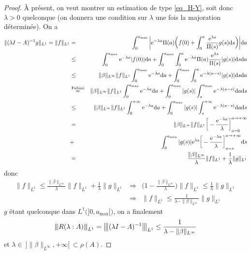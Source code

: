 \begin{proof}
    \`A présent, on veut montrer un estimation de type \eqref{eq_H-Y}, soit donc $\lambda >0$ quelconque (on donnera une condition sur $\lambda$ une fois la majoration déterminée). On a
    \begin{eqnarray*}
        \|(\lambda I-A)^{-1}g\|_{L^1} = \|f\|_{L^1} &=& \int_0^{a_{\max}} \bigg|\mathrm{e}^{-\lambda a}\Pi(a)\bigg(f(0)+\int_0^a \frac{\mathrm{e}^{\lambda s}}{\Pi(s)}g(s)\mathrm{d} s \bigg)\bigg| \mathrm{d} a \\
        &\leq& \int_0^{a_{\max}} \mathrm{e}^{-\lambda a} |f(0)| \mathrm{d} a +\int_0^{a_{\max}}\int_0^a \mathrm{e}^{-\lambda a}\Pi(a)\frac{\mathrm{e}^{\lambda s}}{\Pi(s)}|g(s)|\mathrm{d} s \mathrm{d} a \\
        &\leq& \|\beta\|_{L^{\infty}}\|f\|_{L^1} \int_0^{a_{\max}} \mathrm{e}^{-\lambda a}\mathrm{d} a + \int_0^{a_{\max}}\int_0^a \mathrm{e}^{-\lambda(a-s)}|g(s)|\mathrm{d} s \mathrm{d} a \\
        &\overset{\text{Fubini}}{=}& \|\beta\|_{L^{\infty}}\|f\|_{L^1} \int_0^{a_{\max}} \mathrm{e}^{-\lambda a}\mathrm{d} a + \int_0^{a_{\max}}|g(s)|\int_{s}^{a_{\max}} \mathrm{e}^{-\lambda (a-s)} \mathrm{d} a \mathrm{d} s \\
        &\leq& \|\beta\|_{L^{\infty}}\|f\|_{L^1} \int_0^{+\infty} \mathrm{e}^{-\lambda a}\mathrm{d} a + \int_0^{a_{\max}}|g(s)|\int_{s}^{+\infty} \mathrm{e}^{-\lambda (a-s)} \mathrm{d} a \mathrm{d} s \\
        &=& \|\beta\|_{L^{\infty}}\|f\|_{L^1} \bigg[-\frac{\mathrm{e}^{-\lambda a}}{\lambda}\bigg]_{a=0}^{a \to +\infty} \\ 
        &+& \int_0^{a_{\max}}|g(s)|\mathrm{e}^{\lambda s} \bigg[-\frac{\mathrm{e}^{-\lambda a}}{\lambda}\bigg]_{a=s}^{a \to +\infty}\mathrm{d} s \\
        &=& \frac{\|\beta\|_{L^{\infty}}}{\lambda}\|f\|_{L^1} + \frac{1}{\lambda}\|g\|_{L^1}
    \end{eqnarray*}
    donc 
    \begin{eqnarray*}
        \|f\|_{L^1} \leq \frac{\|\beta\|_{L^{\infty}}}{\lambda}\|f\|_{L^1} + \frac{1}{\lambda}\|g\|_{L^1} &\Longrightarrow& 
        \bigg(1-\frac{\|\beta\|_{L^\infty}}{\lambda}\bigg)\|f\|_{L^1} \leq \frac{1}{\lambda}\|g\|_{L^1} \\
        &\Longrightarrow& \|f\|_{L^1} \leq \frac{1}{\lambda - \|\beta\|_{L^{\infty}}} \|g\|_{L^1}
    \end{eqnarray*}
    $g$ étant quelconque dans $L^1\big(]0,a_{\max}[\big)$, on a finalement 
    \begin{equation*}
        {\left\vert\kern-0.25ex\left\vert \kern-0.25ex\left\vert R(\lambda : A) \right\vert\kern-0.25ex\right\vert\kern-0.25ex\right\vert}_{L^1} = {\left\vert\kern-0.25ex\left\vert \kern-0.25ex\left\vert (\lambda I- A)^{-1} \right\vert\kern-0.25ex\right\vert\kern-0.25ex\right\vert}_{L^1} \leq \frac{1}{\lambda - \|\beta\|_{L^\infty}}
    \end{equation*}
    et $\lambda \in \ ]\|\beta\|_{L^{\infty}},+\infty[ \ \subset \rho(A)$.
\end{proof}

